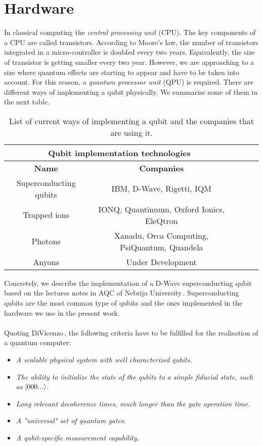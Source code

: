 
\chapter{Hardware} %
\label{AppendixC} %
In classical computing the \textit{central processing unit} (CPU). The key components of a CPU are called transistors. According to Moore's law, the number of transistors integrated in a micro-controller is doubled every two years. Equivalently, the size of transistor is getting smaller every two year. However, we are approaching to a size where quantum effects are starting to appear and have to be taken into account. For this reason, a \textit{quantum processor unit} (QPU) is required. There are different ways of implementing a qubit physically. We summarise some of them in the next table.
\begin{table}[H]
\centering
\begin{tabular}{ |c|c|c|c|c|  }
 \hline
 \multicolumn{2}{|c|}{\textbf{Qubit implementation technologies}} \\
 \hline
 \textbf{Name} & \textbf{Companies}  \\
 \hline
Superconducting qubits         & IBM, D-Wave, Rigetti, IQM \\
 \hline
Trapped ions         & IONQ, Quantinuum, Oxford Ionics, EleQtron \\
 \hline
Photons     & Xanadu, Orca Computing, PsiQuantum, Quandela \\
 \hline
Anyons      & Under Development \\
 \hline
\end{tabular}
\caption{List of current ways of implementing a qubit and the companies that are using it.}
\label{tab:QubitTechnologies}
\end{table}
Concretely, we describe the implementation of a D-Wave superconducting qubit based on the lectures notes in AQC of Nebrija University\,\cite{AlvaroDiazComputacionAdiabatica}.  Superconducting qubits are the most common type of qubits and the ones implemented in the hardware we use in the present work. \\\\
Quoting DiVicenzo\,\cite{Divincenzo2000TheComputation}, the following criteria have to be fulfilled for the realisation of a quantum computer:
\begin{displayquote}
\begin{itemize}
    \item \textit{A scalable physical system with well characterized qubits.}
    \item \textit{The ability to initialize the state of the qubits to a simple fiducial state, such as} $\ket{000...}$.
    \item \textit{Long relevant decoherence times, much longer than the gate operation time.}
    \item \textit{A "universal" set of quantum gates.}
    \item \textit{A qubit-specific measurement capability.}
\end{itemize}
\end{displayquote}
